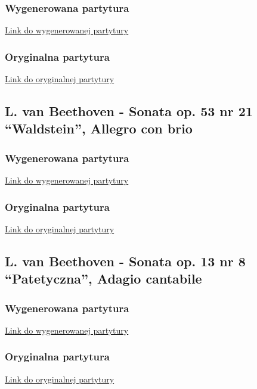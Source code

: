 \documentclass[a4paper,twoside,12pt]{book}
\begin{document}
\subsubsection{Wygenerowana partytura}
\hyperref[fig:generated_chopin]{Link do wygenerowanej partytury}
\subsubsection{Oryginalna partytura}
\hyperref[fig:original_chopin]{Link do oryginalnej partytury}

\subsection{L. van Beethoven - Sonata op. 53 nr 21 ``Waldstein'', Allegro con brio}
\subsubsection{Wygenerowana partytura}
\hyperref[fig:generated_waldstein]{Link do wygenerowanej partytury}
\subsubsection{Oryginalna partytura}
\hyperref[fig:original_waldstein]{Link do oryginalnej partytury}

\subsection{L. van Beethoven - Sonata op. 13 nr 8 ``Patetyczna'', Adagio cantabile}
\subsubsection{Wygenerowana partytura}
\hyperref[fig:generated_pathetique]{Link do wygenerowanej partytury}
\subsubsection{Oryginalna partytura}
\hyperref[fig:original_pathetique]{Link do oryginalnej partytury}
\end{document}
